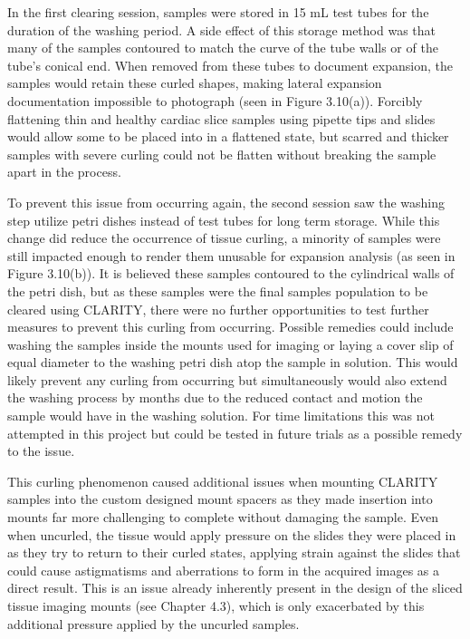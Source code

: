     
In the first clearing session, samples were stored in 15 mL test tubes for the duration of the washing period. A side effect of this storage method was that many of the samples contoured to match the curve of the tube walls or of the tube's conical end. When removed from these tubes to document expansion, the samples would retain these curled shapes, making lateral expansion documentation impossible to photograph (seen in Figure 3.10(a)). Forcibly flattening thin and healthy cardiac slice samples using pipette tips and slides would allow some to be placed into in a flattened state, but scarred and thicker samples with severe curling could not be flatten without breaking the sample apart in the process.  

To prevent this issue from occurring again, the second session saw the washing step utilize petri dishes instead of test tubes for long term storage. While this change did reduce the occurrence of tissue curling, a minority of samples were still impacted enough to render them unusable for expansion analysis (as seen in Figure 3.10(b)). It is believed these samples contoured to the cylindrical walls of the petri dish, but as these samples were the final samples population to be cleared using CLARITY, there were no further opportunities to test further measures to prevent this curling from occurring. Possible remedies could include washing the samples inside the mounts used for imaging or laying a cover slip of equal diameter to the washing petri dish atop the sample in solution. This would likely prevent any curling from occurring but simultaneously would also extend the washing process by months due to the reduced contact and motion the sample would have in the washing solution. For time limitations this was not attempted in this project but could be tested in future trials as a possible remedy to the issue.

This curling phenomenon caused additional issues when mounting CLARITY samples into the custom designed mount spacers as they made insertion into mounts far more challenging to complete without damaging the sample. Even when uncurled, the tissue would apply pressure on the slides they were placed in as they try to return to their curled states, applying strain against the slides that could cause astigmatisms and aberrations to form in the acquired images as a direct result. This is an issue already inherently present in the design of the sliced tissue imaging mounts (see Chapter 4.3), which is only exacerbated by this additional pressure applied by the uncurled samples. 

